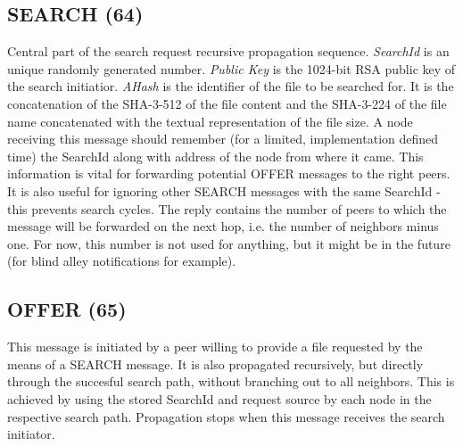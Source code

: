 \subsection{SEARCH (64)}

Central part of the search request recursive propagation sequence. 
\textit{SearchId} is an unique randomly generated number. \textit{Public Key} 
is the 1024-bit RSA public key of the search initiatior. \textit{AHash} is the 
identifier of the file to be searched for. It is the concatenation of the 
SHA-3-512 of the file content and the SHA-3-224 of the file name concatenated 
with the textual representation of the file size. A node receiving this message 
should remember (for a limited, implementation defined time) the SearchId along 
with address of the node from where it came. This information is vital for 
forwarding potential OFFER messages to the right peers. It is also useful for 
ignoring other SEARCH messages with the same SearchId - this prevents search 
cycles. The reply contains the number of peers to which the message will be 
forwarded on the next hop, i.e. the number of neighbors minus one. For now, 
this number is not used for anything, but it might be in the future (for blind 
alley notifications for example).

\begin{figure}[H]
    \centering
\end{figure}

\subsection{OFFER (65)}

This message is initiated by a peer willing to provide a file requested by the 
means of a SEARCH message. It is also propagated recursively, but directly 
through the succesful search path, without branching out to all neighbors. This 
is achieved by using the stored SearchId and request source by each node in the 
respective search path. Propagation stops when this message receives the search 
initiator.

